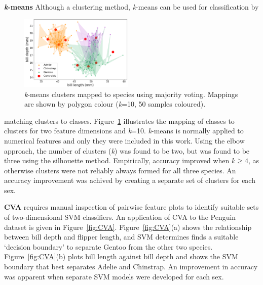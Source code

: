 \documentclass[a4paper, 11pt]{article}
\begin{document}
\textbf{\textit{k}-means} Although a clustering method, 
\textit{k}-means can be used for classification by 
\begin{figure} %
  \centering
  \vspace{0\baselineskip} %
  \includegraphics[width=0.48\textwidth]{kmeansmap.png} %
  \vspace{-0.5\baselineskip} %
  \caption{\centering\linespread{0.8}\selectfont \textit{k}-means clusters mapped to species using majority voting. 
  Mappings are shown by polygon colour (\textit{k}=10, 50 samples coloured).}
  \vspace{-1\baselineskip} %
  \label{fig:kmeansmap}
\end{figure}
matching clusters to classes. 
Figure~\ref{fig:kmeansmap} illustrates the mapping of classes to clusters for two feature dimensions and \textit{k}=10.
\textit{k}-means is normally applied to numerical features and only they were included in this work. 
Using the elbow approach, the number of clusters (\textit{k}) was found to be two, but was found to be three using the silhouette method.
Empirically, accuracy improved when \(k \geq 4\),
as otherwise clusters were not reliably always formed for all three species.   
An accuracy improvement was achived by creating a separate set of clusters for each sex.

\textbf{CVA}  
requires manual inspection of pairwise feature plots 
to identify suitable sets of two-dimensional SVM classifiers. 
An application of CVA to the Penguin dataset is given in Figure~\ref{fig:CVA}. 
Figure~\ref{fig:CVA}(a) shows the relationship between bill depth and flipper length, and
SVM determines finds a suitable `decision boundary' to separate Gentoo from the other two species. 
Figure~\ref{fig:CVA}(b) plots bill length against bill depth and shows the SVM boundary that best 
separates Adelie and Chinstrap. An improvement in accuracy
was apparent when separate SVM models were developed for each sex.
\end{document}
